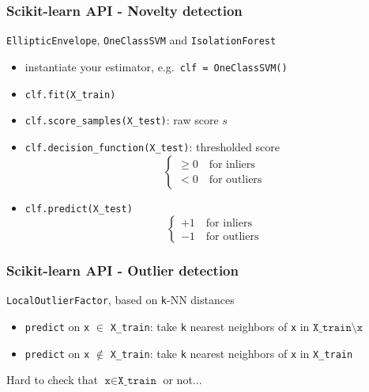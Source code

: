 \documentclass[slidetop,11pt]{beamer}
\begin{document}
\begin{frame}\frametitle{Scikit-learn API - Novelty detection}

\texttt{EllipticEnvelope}, \texttt{OneClassSVM} and \texttt{IsolationForest}

\begin{itemize}
  \item instantiate your estimator, e.g.~\texttt{clf = OneClassSVM()}
  \item \texttt{clf.fit(X_train)}
  \item \texttt{clf.score_samples(X_test)}: raw score $s$
  \item \texttt{clf.decision_function(X_test)}: thresholded score
  \begin{equation*}
  \begin{cases}
    \geq 0 \quad \text{for inliers} \\
    < 0 \quad \text{for outliers}
  \end{cases}
  \end{equation*}
  \item \texttt{clf.predict(X_test)}
  \begin{equation*}
  \begin{cases}
    +1 \quad \text{for inliers} \\
    -1 \quad \text{for outliers}
  \end{cases}
  \end{equation*}
\end{itemize}

\end{frame}


\begin{frame}\frametitle{Scikit-learn API - Outlier detection}

\texttt{LocalOutlierFactor}, based on \texttt{k}-NN distances

\begin{itemize}
  \item \texttt{predict} on \texttt{x} $\in$ \texttt{X_train}: take \texttt{k} nearest neighbors of \texttt{x} in $\texttt{X_train} \setminus \texttt{x}$
  \item \texttt{predict} on \texttt{x} $\notin$ \texttt{X_train}: take \texttt{k} nearest neighbors of \texttt{x} in \texttt{X_train}
\end{itemize}
\begin{center}
Hard to check that $\texttt{x} \in \texttt{X_train}$ or not...
\end{center}

\end{frame}
\end{document}
